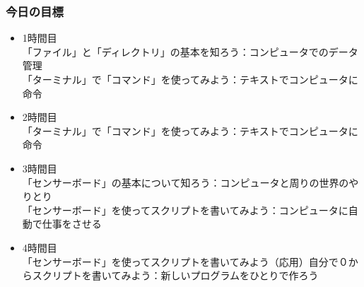 \begin{frame}
    \frametitle{今日の目標} 
    \begin{itemize}
        \item 1時間目\\
        {\footnotesize「ファイル」と「ディレクトリ」の基本を知ろう：コンピュータでのデータ管理\\
        「ターミナル」で「コマンド」を使ってみよう：テキストでコンピュータに命令\\}
        \item 2時間目\\
        {\footnotesize「ターミナル」で「コマンド」を使ってみよう：テキストでコンピュータに命令\\}
        \item 3時間目\\
        {\footnotesize「センサーボード」の基本について知ろう：コンピュータと周りの世界のやりとり\\
        「センサーボード」を使ってスクリプトを書いてみよう：コンピュータに自動で仕事をさせる\\}
        \item 4時間目\\
        {\footnotesize「センサーボード」を使ってスクリプトを書いてみよう（応用）自分で０からスクリプトを書いてみよう：新しいプログラムをひとりで作ろう\\}
    \end{itemize}
\end{frame}

